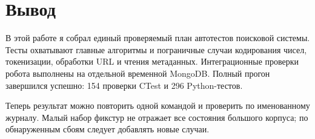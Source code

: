 \documentclass[12pt,a4paper]{article}
\begin{document}
\newpage
\section{Вывод}
В этой работе я собрал единый проверяемый план автотестов поисковой системы.
Тесты охватывают главные алгоритмы и пограничные случаи кодирования чисел,
токенизации, обработки URL и чтения метаданных. Интеграционные проверки
робота выполнены на отдельной временной MongoDB.
Полный прогон завершился успешно: 154 проверки CTest и 296 Python-тестов.

Теперь результат можно повторить одной командой и проверить по именованному
журналу. Малый набор фикстур не отражает все состояния большого корпуса;
по обнаруженным сбоям следует добавлять новые случаи.
\end{document}
